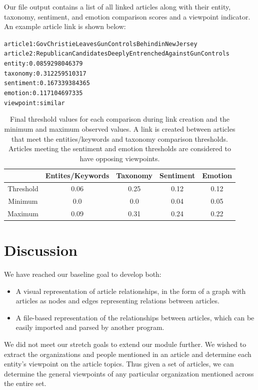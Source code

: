 \documentclass[12pt]{article}
\begin{document}
Our file output contains a list of all linked articles along with their entity, taxonomy, sentiment, and emotion comparison scores and a viewpoint indicator. An example article link is shown below:
\begin{alltt}
article 1: GovChristieLeavesGunControlsBehindinNewJersey
article 2: RepublicanCandidatesDeeplyEntrenchedAgainstGunControls
entity:    0.0859298046379
taxonomy:  0.312259510317
sentiment: 0.167339384365
emotion:   0.117104697335
viewpoint: similar
\end{alltt}

\begin{table}
	\begin{tabular}{|c|c|c|c|c|}\hline
		 & Entites/Keywords & Taxonomy & Sentiment & Emotion\\\hline
		Threshold & 0.06 & 0.25 & 0.12 & 0.12\\\hline
		Minimum & 0.0 & 0.0 & 0.04 & 0.05\\\hline
		Maximum & 0.09 & 0.31 & 0.24 & 0.22 \\\hline
	\end{tabular}
	\caption{Final threshold values for each comparison during link creation and the minimum and maximum observed values. A link is created between articles that meet the entities/keywords and taxonomy comparison thresholds. Articles meeting the sentiment and emotion thresholds are considered to have opposing viewpoints.}
	\label{table:thresholds}
\end{table}

\section{Discussion}
We have reached our baseline goal to develop both:
\begin{itemize}
\item A visual representation of article relationships, in the form of a graph with articles as nodes and edges representing relations between articles.
\item A file-based representation of the relationships between articles, which can be easily imported and parsed by another program.
\end{itemize}
We did not meet our stretch goals to extend our module further. We wished to extract the organizations and people mentioned in an article and determine each entity's viewpoint on the article topics. Thus given a set of articles, we can determine the general viewpoints of any particular organization mentioned across the entire set.
\end{document}

